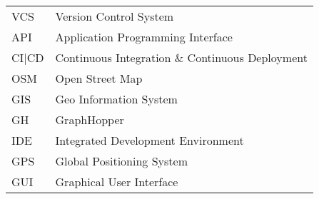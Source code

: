\begin{singlespace}
\begin{flushleft}
\begin{longtable}{p{2 cm}p{14 cm}}
  VCS & Version Control System \\
  API & Application Programming Interface \\
  CI|CD & Continuous Integration \& Continuous Deployment \\
  OSM & Open Street Map \\
  GIS & Geo Information System \\
  GH & GraphHopper \\
  IDE & Integrated Development Environment \\
  GPS & Global Positioning System \\
  GUI & Graphical User Interface \\	
\end{longtable}
\end{flushleft}
\end{singlespace}